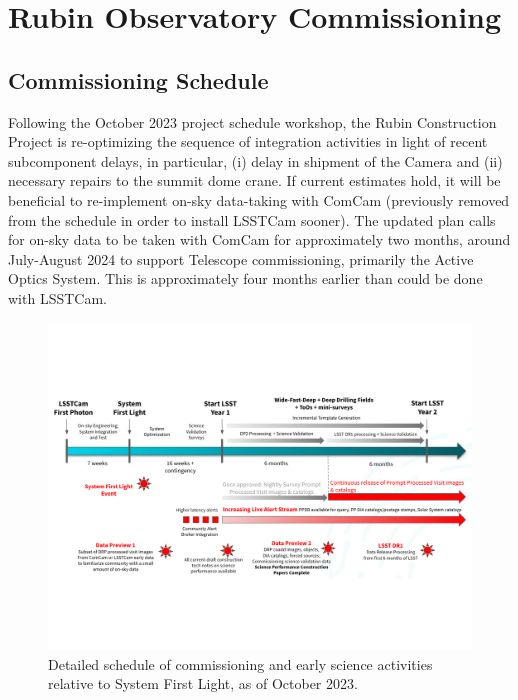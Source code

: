 \section{Rubin Observatory Commissioning}
\label{sec:commissioning}

\subsection{Commissioning Schedule}
\label{ssec:commissioning-schedule}

Following the October 2023 project schedule workshop, the Rubin Construction Project is re-optimizing the sequence of integration activities in light of recent subcomponent delays, in particular, (i) delay in shipment of the Camera and (ii) necessary repairs to the  summit dome crane.
If current estimates hold, it will be beneficial to re-implement on-sky data-taking with ComCam (previously removed from the schedule in order to install LSSTCam sooner).
The updated plan calls for on-sky data to be taken with ComCam for approximately two months, around July-August 2024 to support Telescope commissioning, primarily the Active Optics System. 
This is approximately four months earlier than could be done with LSSTCam. 

\begin{figure}[htb]
\centering
\includegraphics[width=0.98\linewidth]{figures/rubinobs_on-sky_commissioning_and_early_science.pdf}
\caption{Detailed schedule of commissioning  and early science activities relative to System First Light, as of October 2023.}
\label{fig:commissioning-es-schedule}
\vspace{0.1cm}
\end{figure}

